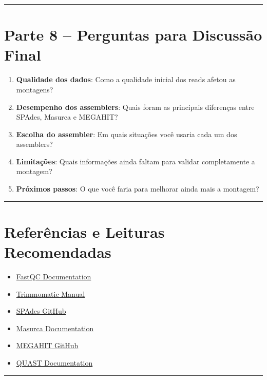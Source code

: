 \documentclass[
  brazilian,
  letterpaper,
  DIV=11,
  numbers=noendperiod]{scrartcl}
\providecommand{\tightlist}{%
  \setlength{\itemsep}{0pt}\setlength{\parskip}{0pt}}
\begin{document}
\begin{center}\rule{0.5\linewidth}{0.5pt}\end{center}

\section{Parte 8 -- Perguntas para Discussão
Final}\label{parte-8-perguntas-para-discussuxe3o-final}

\begin{enumerate}
\def\labelenumi{\arabic{enumi}.}
\tightlist
\item
  \textbf{Qualidade dos dados}: Como a qualidade inicial dos reads
  afetou as montagens?
\item
  \textbf{Desempenho dos assemblers}: Quais foram as principais
  diferenças entre SPAdes, Masurca e MEGAHIT?
\item
  \textbf{Escolha do assembler}: Em quais situações você usaria cada um
  dos assemblers?
\item
  \textbf{Limitações}: Quais informações ainda faltam para validar
  completamente a montagem?
\item
  \textbf{Próximos passos}: O que você faria para melhorar ainda mais a
  montagem?
\end{enumerate}

\begin{center}\rule{0.5\linewidth}{0.5pt}\end{center}

\section{Referências e Leituras
Recomendadas}\label{referuxeancias-e-leituras-recomendadas}

\begin{itemize}
\tightlist
\item
  \href{https://www.bioinformatics.babraham.ac.uk/projects/fastqc/}{FastQC
  Documentation}
\item
  \href{http://www.usadellab.org/cms/?page=trimmomatic}{Trimmomatic
  Manual}
\item
  \href{https://github.com/ablab/spades}{SPAdes GitHub}
\item
  \href{https://masurca.readthedocs.io/en/latest/}{Masurca
  Documentation}
\item
  \href{https://github.com/voutcn/megahit}{MEGAHIT GitHub}
\item
  \href{http://quast.sourceforge.net/docs/manual.html}{QUAST
  Documentation}
\end{itemize}

\begin{center}\rule{0.5\linewidth}{0.5pt}\end{center}
\end{document}
